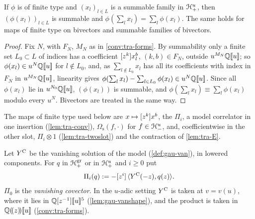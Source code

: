 \begin{lem}
\label{lem:tra-sum}
If $\phi$ is of finite type and $(x_l)_{l\in L}$ is a summable family in $\mathcal{H}^u_+$, then $(\phi(x_l))_{l\in L}$ is summable and $\phi(\sum_lx_l) = \sum_l\phi(x_l)$. The same holds for maps of finite type on bivectors and summable families of bivectors.
\end{lem}

\begin{proof}
Fix $N$, with $F_N$, $M_N$ as in \cref{conv:tra-forms}. By summability only a finite set $L_0\subset L$ of indices has a coefficient $[z^k]x_l^b$, $(k,b)\in F_N$, outside $u^{M_N}\mathbb{Q}[\![ u ]\!]$; so $\phi(x_l)\in u^N\mathbb{Q}[\![ u ]\!]$ for $l\notin L_0$, and, as $\sum_{l\notin L_0}x_l$ has all its coefficients with index in $F_N$ in $u^{M_N}\mathbb{Q}[\![ u ]\!]$, linearity gives $\phi(\sum_lx_l)-\sum_{l\in L_0}\phi(x_l)\in u^N\mathbb{Q}[\![ u ]\!]$. Since all $\phi(x_l)$ lie in $u^{N_0}\mathbb{Q}[\![ u ]\!]$, $(\phi(x_l))$ is summable, and $\phi(\sum_lx_l)\equiv\sum_l\phi(x_l)$ modulo every $u^N$. Bivectors are treated in the same way.
\end{proof}

The maps of finite type used below are $x\mapsto[z^k]x^b$, the $\Pi_i$, a model correlator in one insertion (\cref{lem:tra-conv}), $\Omega_{\mathrm s}(f,\cdot)$ for $f\in\mathcal{H}^u_-$, and, coefficientwise in the other slot, $\Pi_i\otimes 1$ (\cref{lem:tra-twoslot}) and the contraction of \cref{lem:tra-E}.

\begin{defn}
\label{def:tra-tower}
Let $Y^{\mathrm{C}}$ be the vanishing solution of the model (\cref{def:gau-van}), in lowered components. For $q$ in $\mathcal{H}^{\mathrm{gr}}_+$ or in $\mathcal{H}^u_+$ and $i\geq 0$ put
\begin{equation}
\label{eq:tra-tower}
\Pi_i(q) := -[z^i]\,\langle Y^{\mathrm{C}}(-z),q(z)\rangle .
\end{equation}
$\Pi_0$ is the \emph{vanishing covector}. In the $u$-adic setting $Y^{\mathrm{C}}$ is taken at $v = v(u)$, where it lies in $\mathbb{Q}[z^{-1}][\![ u ]\!]^5$ (\cref{lem:gau-vanshape}), and the product is taken in $\mathbb{Q}(\!(z)\!)[\![ u ]\!]$ (\cref{conv:tra-forms}).
\end{defn}

